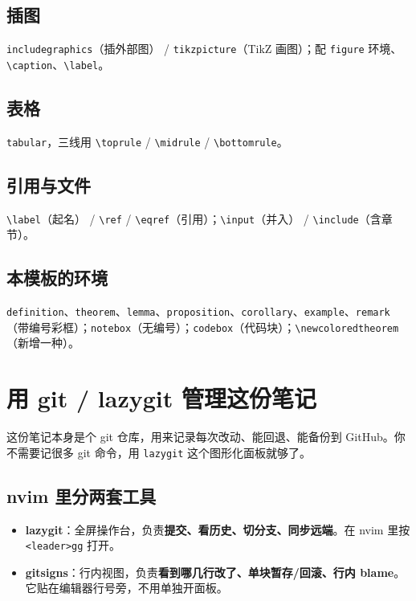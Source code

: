 \subsection{插图}

\texttt{includegraphics}（插外部图） / \texttt{tikzpicture}（TikZ 画图）；配 \texttt{figure} 环境、\texttt{\textbackslash caption}、\texttt{\textbackslash label}。

\subsection{表格}

\texttt{tabular}，三线用 \texttt{\textbackslash toprule} / \texttt{\textbackslash midrule} / \texttt{\textbackslash bottomrule}。

\subsection{引用与文件}

\texttt{\textbackslash label}（起名） / \texttt{\textbackslash ref} / \texttt{\textbackslash eqref}（引用）；\texttt{\textbackslash input}（并入） / \texttt{\textbackslash include}（含章节）。

\subsection{本模板的环境}

\texttt{definition}、\texttt{theorem}、\texttt{lemma}、\texttt{proposition}、\texttt{corollary}、\texttt{example}、\texttt{remark}（带编号彩框）；\texttt{notebox}（无编号）；\texttt{codebox}（代码块）；\texttt{\textbackslash newcoloredtheorem}（新增一种）。

\section{用 git / lazygit 管理这份笔记}

这份笔记本身是个 git 仓库，用来记录每次改动、能回退、能备份到 GitHub。你不需要记很多 git 命令，用 \texttt{lazygit} 这个图形化面板就够了。

\subsection{nvim 里分两套工具}

\begin{itemize}
  \item \textbf{lazygit}：全屏操作台，负责\textbf{提交、看历史、切分支、同步远端}。在 nvim 里按 \texttt{\textless leader\textgreater gg} 打开。
  \item \textbf{gitsigns}：行内视图，负责\textbf{看到哪几行改了、单块暂存/回滚、行内 blame}。它贴在编辑器行号旁，不用单独开面板。
\end{itemize}


